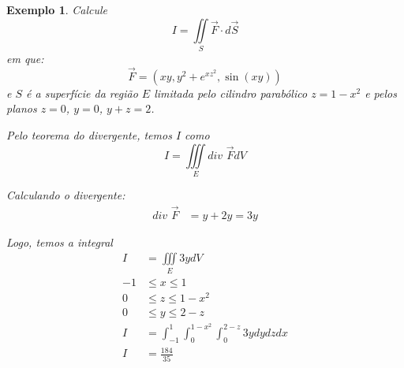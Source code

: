 \documentclass{article}
\newcommand{\doubleint}[2] {\iint\limits_{#1} #2}
\newcommand{\tripleint}[2] {\iiint\limits_{#1} #2}
\newcommand{\Div}[0] {\textit{div }}
\newtheorem{example}{Exemplo}[section]
\begin{document}
            \begin{example}
                Calcule
                \[
                    I = \doubleint{S}{\vec{F}\cdot d\vec{S}}
                \]
                em que:
                \[
                    \vec{F} = (xy, y^2 + e^{xz^2}, \sin (xy))
                \]
                e $S$ é a superfície da região $E$ limitada pelo cilindro parabólico
                $z = 1 - x^2$ e pelos planos $z = 0$, $y = 0$, $y + z = 2$.

                Pelo teorema do divergente, temos $I$ como
                \[
                    I = \tripleint{E}{\Div \vec{F} dV}
                \]

                Calculando o divergente:
                \begin{align*}
                    \Div \vec{F} &= y + 2y = 3y
                \end{align*}

                Logo, temos a integral
                \begin{align*}
                    I &= \tripleint{E}{3y dV}\\
                    -1 &\leq x \leq 1\\
                    0 &\leq z \leq 1 - x^2\\
                    0 &\leq y \leq 2 - z\\
                    I &= \int_{-1}^1 \int_0^{1 - x^2} \int_0^{2 - z} 3y dy dz dx\\
                    I &= \frac{184}{35}
                \end{align*}
            \end{example}
\end{document}
